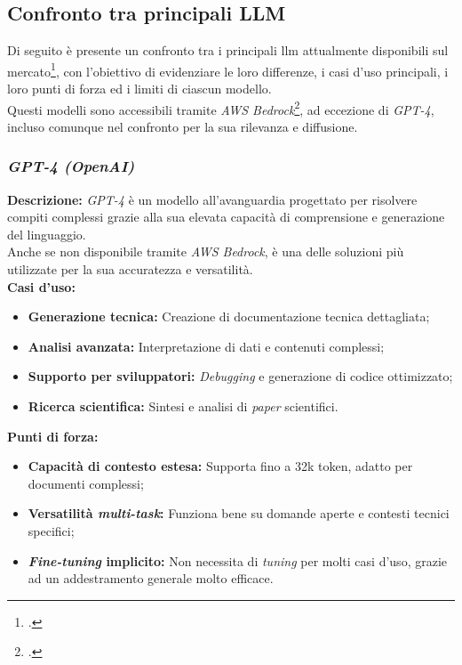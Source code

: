 \subsection{Confronto tra principali LLM}
\label{subsec:llm-confronto}

Di seguito è presente un confronto tra i principali \gls{llm} attualmente disponibili sul mercato\footcite{site:key-differences-llm}, con l'obiettivo di evidenziare le loro differenze, i casi d'uso principali, i loro punti di forza ed i limiti di ciascun modello.\\
Questi modelli sono accessibili tramite \textit{AWS Bedrock}\footcite{site:aws-bedrock}, ad eccezione di \textit{GPT-4}, incluso comunque nel confronto per la sua rilevanza e diffusione.

\subsubsection{\textit{GPT-4 (OpenAI)}}

\noindent \textbf{Descrizione:}
\textit{GPT-4} è un modello all’avanguardia progettato per risolvere compiti complessi grazie alla sua elevata capacità di comprensione e generazione del linguaggio. \\
Anche se non disponibile tramite \textit{AWS Bedrock}, è una delle soluzioni più utilizzate per la sua accuratezza e versatilità.\\

\noindent \textbf{Casi d’uso:}
\begin{itemize}
   \item \textbf{Generazione tecnica:} Creazione di documentazione tecnica dettagliata;
   \item \textbf{Analisi avanzata:} Interpretazione di dati e contenuti complessi;
   \item \textbf{Supporto per sviluppatori:} \textit{Debugging} e generazione di codice ottimizzato;
   \item \textbf{Ricerca scientifica:} Sintesi e analisi di \textit{paper} scientifici.
\end{itemize}

\noindent \textbf{Punti di forza:}
\begin{itemize}
    \item \textbf{Capacità di contesto estesa:} Supporta fino a 32k \gls{token}, adatto per documenti complessi;
    \item \textbf{Versatilità \textit{multi-task}:} Funziona bene su domande aperte e contesti tecnici specifici;
    \item \textbf{\textit{Fine-tuning} implicito:} Non necessita di \textit{tuning} per molti casi d’uso, grazie ad un addestramento generale molto efficace.
\end{itemize}

